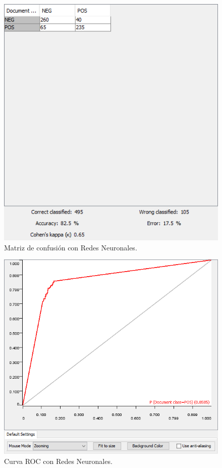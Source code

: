 \begin{figure}[t]
    \center\includegraphics[width=.95\linewidth]{img/classification/cmNN.png}
    \caption{Matriz de confusión con Redes Neuronales.}
\end{figure}

\begin{figure}[t]
    \center\includegraphics[width=.95\linewidth]{img/classification/rocNN.png}
    \caption{Curva ROC con Redes Neuronales.}
\end{figure}

